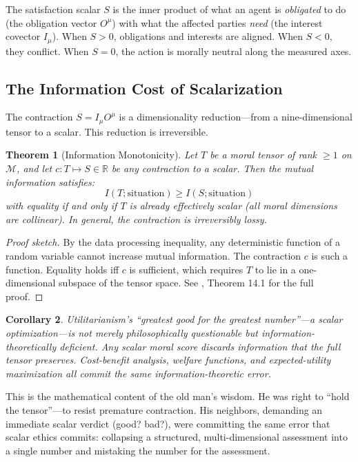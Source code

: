 \documentclass[12pt,letterpaper]{article}
\newtheorem{theorem}{Theorem}[section]
\newtheorem{corollary}[theorem]{Corollary}
\theoremstyle{definition}
\theoremstyle{remark}
\newcommand{\M}{\mathcal{M}}
\newcommand{\R}{\mathbb{R}}
\begin{document}
The satisfaction scalar $S$ is the inner product of what an agent is \emph{obligated} to do (the obligation vector $O^\mu$) with what the affected parties \emph{need} (the interest covector $I_\mu$). When $S > 0$, obligations and interests are aligned. When $S < 0$, they conflict. When $S = 0$, the action is morally neutral along the measured axes.

\subsection{The Information Cost of Scalarization}

The contraction $S = I_\mu O^\mu$ is a dimensionality reduction---from a nine-dimensional tensor to a scalar. This reduction is irreversible.

\begin{theorem}[Information Monotonicity]
\label{thm:info_mono}
Let $T$ be a moral tensor of rank $\geq 1$ on $\M$, and let $c: T \mapsto S \in \R$ be any contraction to a scalar. Then the mutual information satisfies:
\[
I(T; \text{situation}) \geq I(S; \text{situation})
\]
with equality if and only if $T$ is already effectively scalar (all moral dimensions are collinear). In general, the contraction is irreversibly lossy.
\end{theorem}

\begin{proof}[Proof sketch]
By the data processing inequality, any deterministic function of a random variable cannot increase mutual information. The contraction $c$ is such a function. Equality holds iff $c$ is sufficient, which requires $T$ to lie in a one-dimensional subspace of the tensor space. See \cite{bond2026geometric}, Theorem 14.1 for the full proof.
\end{proof}

\begin{corollary}
Utilitarianism's ``greatest good for the greatest number''---a scalar optimization---is not merely philosophically questionable but \emph{information-theoretically deficient}. Any scalar moral score discards information that the full tensor preserves. Cost-benefit analysis, welfare functions, and expected-utility maximization all commit the same information-theoretic error.
\end{corollary}

This is the mathematical content of the old man's wisdom. He was right to ``hold the tensor''---to resist premature contraction. His neighbors, demanding an immediate scalar verdict (good? bad?), were committing the same error that scalar ethics commits: collapsing a structured, multi-dimensional assessment into a single number and mistaking the number for the assessment.
\end{document}
